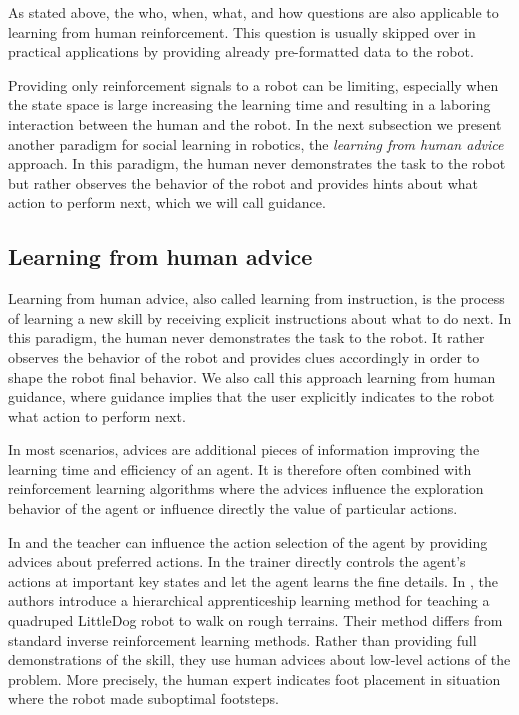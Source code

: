 \transition

As stated above, the who, when, what, and how questions are also applicable to learning from human reinforcement. This question is usually skipped over in practical applications by providing already pre-formatted data to the robot.

Providing only reinforcement signals to a robot can be limiting, especially when the state space is large increasing the learning time and resulting in a laboring interaction between the human and the robot. In the next subsection we present another paradigm for social learning in robotics, the \emph{learning from human advice} approach. In this paradigm, the human never demonstrates the task to the robot but rather observes the behavior of the robot and provides hints about what action to perform next, which we will call guidance.

\subsection{Learning from human advice}

Learning from human advice, also called learning from instruction, is the process of learning a new skill by receiving explicit instructions about what to do next. In this paradigm, the human never demonstrates the task to the robot. It rather observes the behavior of the robot and provides clues accordingly in order to shape the robot final behavior. We also call this approach learning from human guidance, where guidance implies that the user explicitly indicates to the robot what action to perform next.

In most scenarios, advices are additional pieces of information improving the learning time and efficiency of an agent. It is therefore often combined with reinforcement learning algorithms where the advices influence the exploration behavior of the agent or influence directly the value of particular actions. 

In \cite{clouse1992teaching} and \cite{maclin2005giving} the teacher can influence the action selection of the agent by providing advices about preferred actions. In  \cite{smart2002effective} the trainer directly controls the agent's actions at important key states and let the agent learns the fine details. In \cite{kolter2007hierarchical}, the authors introduce a hierarchical apprenticeship learning method for teaching a quadruped LittleDog robot to walk on rough terrains. Their method differs from standard inverse reinforcement learning methods. Rather than providing full demonstrations of the skill, they use human advices about low-level actions of the problem. More precisely, the human expert indicates foot placement in situation where the robot made suboptimal footsteps.

